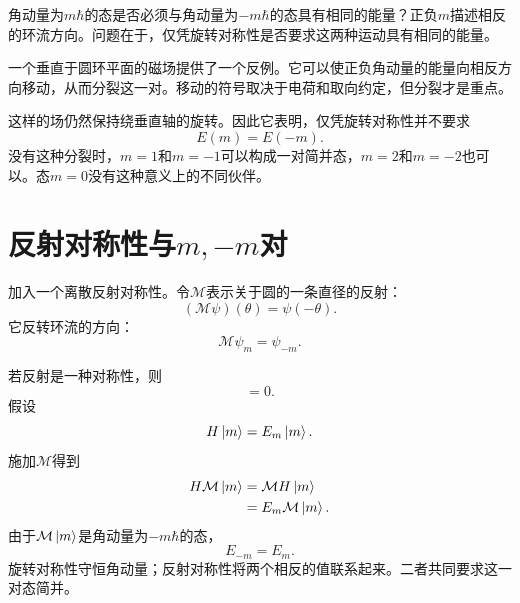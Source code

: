 角动量为\(m\hbar\)的态是否必须与角动量为\(-m\hbar\)的态具有相同的能量？正负\(m\)描述相反的环流方向。问题在于，仅凭旋转对称性是否要求这两种运动具有相同的能量。

\begin{classroomqa}
\end{classroomqa}

一个垂直于圆环平面的磁场提供了一个反例。它可以使正负角动量的能量向相反方向移动，从而分裂这一对。移动的符号取决于电荷和取向约定，但分裂才是重点。

这样的场仍然保持绕垂直轴的旋转。因此它表明，仅凭旋转对称性并不要求
\begin{equation}
E(m)=E(-m).
\end{equation}
没有这种分裂时，\(m=1\)和\(m=-1\)可以构成一对简并态，\(m=2\)和\(m=-2\)也可以。态\(m=0\)没有这种意义上的不同伙伴。

\section{反射对称性与\texorpdfstring{\(m,-m\)}{m, -m}对}

加入一个离散反射对称性。令\(\mathcal M\)表示关于圆的一条直径的反射：
\begin{equation}
(\mathcal M\psi)(\theta)=\psi(-\theta).
\end{equation}
它反转环流的方向：
\begin{equation}
\mathcal M\psi_m=\psi_{-m}.
\end{equation}

若反射是一种对称性，则
\begin{equation}
[\mathcal M,H]=0.
\end{equation}
假设
\begin{equation}
H\left\lvert m\right\rangle=E_m\left\lvert m\right\rangle.
\end{equation}
施加\(\mathcal M\)得到
\begin{align}
H\mathcal M\left\lvert m\right\rangle
&=\mathcal M H\left\lvert m\right\rangle\\
&=E_m\mathcal M\left\lvert m\right\rangle.
\end{align}
由于\(\mathcal M\left\lvert m\right\rangle\)是角动量为\(-m\hbar\)的态，
\begin{equation}
E_{-m}=E_m.
\end{equation}
旋转对称性守恒角动量；反射对称性将两个相反的值联系起来。二者共同要求这一对态简并。

